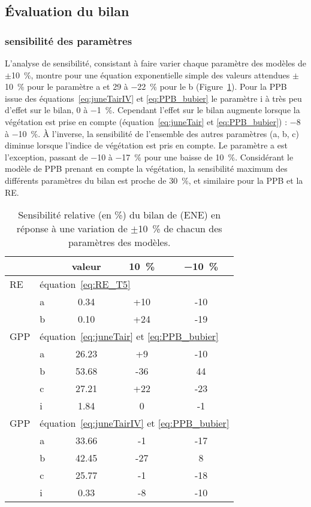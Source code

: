 \subsection{Évaluation du bilan}

\subsubsection{sensibilité des paramètres}

L'analyse de sensibilité, consistant à faire varier chaque paramètre des modèles de $\pm$\SI{10}{\percent}, montre pour une équation exponentielle simple des valeurs attendues $\pm$\SI{10}{\percent} pour le paramètre a et \num{+29} à \SI{-22}{\percent} pour le b (Figure~\ref{table:mdl_sensitiv}).
Pour la PPB issue des équations~\ref{eq:juneTairIV} et \ref{eq:PPB_bubier} le paramètre i à très peu d'effet sur le bilan, \num{0} à \SI{-1}{\percent}.
Cependant l'effet sur le bilan augmente lorsque la végétation est prise en compte (équation~\ref{eq:juneTair} et \ref{eq:PPB_bubier}) : \num{-8} à \SI{-10}{\percent}.
À l'inverse, la sensibilité de l'ensemble des autres paramètres (a, b, c) diminue lorsque l'indice de végétation est pris en compte.
Le paramètre a est l'exception, passant de \num{-10} à \SI{-17}{\percent} pour une baisse de \SI{10}{\percent}.
Considérant le modèle de PPB prenant en compte la végétation, la sensibilité maximum des différents paramètres du bilan est proche de \SI{30}{\percent}, et similaire pour la PPB et la RE.

\begin{table}
\centering
\caption{Sensibilité relative (en \%) du bilan de \coo (ENE) en réponse à une variation de $\pm$\SI{10}{\percent} de chacun des paramètres des modèles.}
\label{table:mdl_sensitiv}
\begin{tabular}{llccc}\toprule
& & valeur & \SI{+10}{\percent} & \SI{-10}{\percent} \\ \midrule
RE & \multicolumn{4}{l}{équation~\ref{eq:RE_T5}} \\ 
& a & 0.34 & +10 & -10 \\
& b & 0.10 & +24 & -19 \\ [+1ex]
GPP & \multicolumn{4}{l}{équation~\ref{eq:juneTair} et \ref{eq:PPB_bubier}} \\
& a & 26.23 & +9 & -10 \\
& b & 53.68 & -36 & 44 \\
& c & 27.21 & +22 & -23 \\
& i & 1.84 & 0 & -1 \\ [+1ex]
GPP & \multicolumn{4}{l}{équation~\ref{eq:juneTairIV} et \ref{eq:PPB_bubier}} \\ 
& a & 33.66 & -1 & -17 \\
& b & 42.45 & -27 & 8 \\
& c & 25.77 & -1 & -18 \\
& i & 0.33 & -8 & -10 \\
\bottomrule
\end{tabular}
\end{table}

